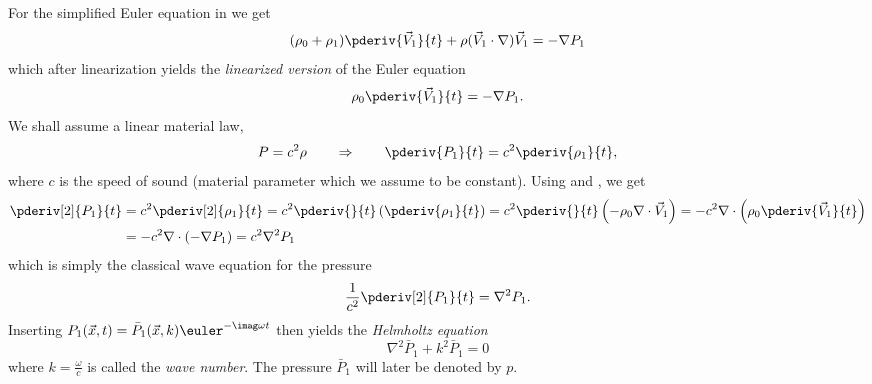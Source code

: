 For the simplified Euler equation in  we get
\begin{equation*}
	(\rho_0+\rho_1)\pderiv{\vec{V}_1}{t}+ \rho (\vec{V}_1\cdot\nabla)\vec{V}_1 = -\nabla P_1
\end{equation*}
which after linearization yields the \textit{linearized version} of the Euler equation
\begin{equation}\label{Eq2:linearizedEulerEquation}
	\rho_0\pderiv{\vec{V}_1}{t} = -\nabla P_1.
\end{equation}
We shall assume a linear material law, 
\begin{equation*}
	P = c^2\rho\qquad \Rightarrow\qquad \pderiv{P_1}{t} = c^2\pderiv{\rho_1}{t},
\end{equation*}
where $c$ is the speed of sound (material parameter which we assume to be constant). Using  and , we get
\begin{align*}
	\pderiv[2]{P_1}{t} &= c^2\pderiv[2]{\rho_1}{t} = c^2\pderiv{}{t}\left(\pderiv{\rho_1}{t}\right)= c^2\pderiv{}{t}\left(-\rho_0\nabla\cdot\vec{V}_1\right) = -c^2\nabla\cdot\left(\rho_0\pderiv{\vec{V}_1}{t}\right)\\
	&= -c^2\nabla\cdot\left(-\nabla P_1\right) = c^2\nabla^2 P_1
\end{align*}
which is simply the classical wave equation for the pressure 
\begin{equation}\label{Eq2:waveEquation}
	\frac{1}{c^2}\pderiv[2]{P_1}{t} = \nabla^2 P_1.
\end{equation}
Inserting $P_1(\vec{x},t) = \bar{P}_1(\vec{x},k)\euler^{-\imag \omega t}$ then yields the \textit{Helmholtz equation}
\begin{equation*}
	\nabla^2\bar{P}_1+k^2\bar{P}_1 = 0
\end{equation*}
where $k=\frac{\omega}{c}$ is called the \textit{wave number}. The pressure $\bar{P}_1$ will later be denoted by $p$.
%
